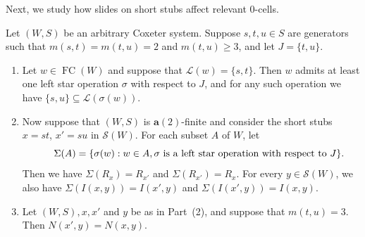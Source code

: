 \documentclass[ALCO,Unicode,published]{cedram}
\newcommand{\call}{\mathcal{L}}
\newcommand{\la}{\mathbf{a}}
\newcommand{\sw}{\mathcal{S}(W)}
\newcommand{\se}{\subseteq}
\DeclareMathOperator{\fc}{\mathrm{FC}}
\begin{document}
Next, we study how slides on short stubs affect relevant 0-cells.


\begin{lemma}
    \label{lemm:slidingMoves}
    Let $(W,S)$ be an arbitrary Coxeter system. Suppose $s,t,u\in S$ are generators such that $m(s,t)=m(t,u)=2$ and
    $m(t,u)\ge 3$, and let $J=\{t,u\}$. 
    \begin{enumerate}
        \item Let $w\in \fc(W)$ and suppose that $\call(w)=\{s,t\}$. Then $w$ admits at least one left star
             operation $\sigma$ with respect to $J$, and for any such operation we have $\{s,u\}\se
             \call(\sigma(w))$.
         \item Now suppose that $(W,S)$ is $\la(2)$-finite and consider the short stubs $x=st$, $x'=su$ in $\sw$.
             For each subset $A$ of $W$, let \[ \hspace{1.5em} \Sigma(A)=\{\sigma(w): w\in A, \sigma
         \text{ is a left star operation with respect to } J\}.  \] Then we have $\Sigma(R_{x})=R_{x'}$ and
         $\Sigma(R_{x'})=R_x$. For every $y\in \sw$, we also have $\Sigma(I(x,y))=I(x',y)$ and $\Sigma(I(x',y))=I(x,y)$.
     \item Let $(W,S), x,x'$ and $y$ be as in Part~(2), and suppose that $m(t,u)=3$.  Then
          $N(x',y)=N(x,y)$.
    \end{enumerate}
\end{lemma}
\end{document}
